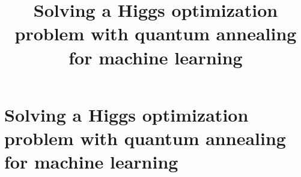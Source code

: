 \documentclass[10pt]{report}
\title{Solving a Higgs optimization problem with quantum annealing for machine learning}
\begin{document}



\flushbottom
\maketitle
\chapter[Higgs]{Solving a Higgs optimization problem with quantum annealing for machine learning}

\printbibliography
\end{document}
